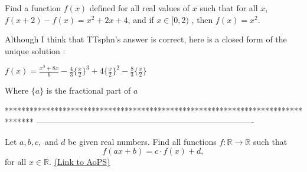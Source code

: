 \begin{mysolution}
	\begin{tcolorbox}Find a function $ f(x)$ defined for all real values of $ x$ such that
for all $ x$, $ f(x + 2) - f(x) = x^2 + 2x + 4$,
and if $ x \in [0,2)$ , then $ f(x) = x^2.$\end{tcolorbox}

Although I think that TTsphn's answer is correct, here is a closed form of the unique solution :

$ f(x)=\frac{x^3+8x}{6}-\frac{4}{3}\{\frac{x}{2}\}^3+4\{\frac{x}{2}\}^2-\frac{8}{3}\{\frac{x}{2}\}$

Where $ \{a\}$ is the fractional part of $ a$
\end{mysolution}
*******************************************************************************
-------------------------------------------------------------------------------

\begin{problem}
	Let $a,b,c,$ and $d$ be given real numbers. Find all functions $f: \mathbb R \to \mathbb R$ such that
\[f(ax+b) = c\cdot f(x)+d,\]
for all $x \in \mathbb R$.
	\flushright \href{https://artofproblemsolving.com/community/c6h169113}{(Link to AoPS)}
\end{problem}



